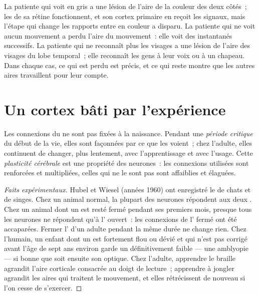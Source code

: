 \begin{example}\label{ex:g11:vision-and-brain:patients}
La patiente qui voit en gris a une lésion de l'aire de la couleur des
deux côtés~; les  de sa rétine fonctionnent, et son cortex
primaire en reçoit les signaux, mais l'étape qui change les rapports
entre  en couleur a disparu. La patiente qui ne voit aucun
mouvement a perdu l'aire du mouvement~: elle voit des instantanés
successifs. La patiente qui ne reconnaît plus les visages a une lésion
de l'aire des visages du lobe temporal~; elle reconnaît les gens à leur
voix ou à un chapeau. Dans chaque cas, ce qui est perdu est précis, et
ce qui reste montre que les autres aires travaillent pour leur compte.
\end{example}

\section{Un cortex bâti par l'expérience}

\begin{proposition}[La plasticité]\label{prop:g11:vision-and-brain:plasticity}
Les connexions du  ne sont pas fixées à la naissance.
Pendant une \emph{période critique} du début de la vie, elles sont
façonnées par ce que les  voient~; chez l'adulte, elles continuent
de changer, plus lentement, avec l'apprentissage et avec l'usage. Cette
\emph{plasticité cérébrale} est une
propriété des neurones~: les connexions utilisées sont renforcées et
multipliées, celles qui ne le sont pas sont affaiblies et élaguées.
\end{proposition}
\begin{proof}[Faits expérimentaux]
Hubel et Wiesel (années 1960) ont enregistré le  de chats
et de singes. Chez un animal normal, la plupart des neurones répondent
aux deux . Chez un animal dont un  est resté fermé pendant ses
premiers mois, presque tous les neurones ne répondent qu'à l'
ouvert~: les connexions de l' fermé ont été accaparées. Fermer l'
d'un adulte pendant la même durée ne change rien. Chez l'humain, un
enfant dont un  est fortement flou ou dévié et qui n'est pas
corrigé avant l'âge de sept ans environ garde un  définitivement
faible --- une amblyopie --- si bonne que soit ensuite son optique.
Chez l'adulte, apprendre le braille agrandit l'aire corticale consacrée
au doigt de lecture~; apprendre à jongler agrandit les aires qui
traitent le mouvement, et elles rétrécissent de nouveau si l'on cesse
de s'exercer.
\end{proof}

